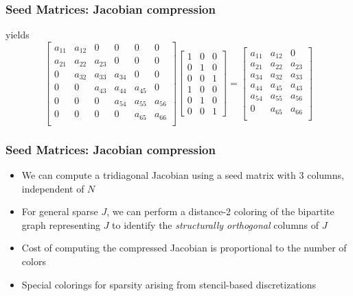 \documentclass[compact,12pt]{beamer}
\begin{document}
\begin{frame}
\large\frametitle{Seed Matrices: Jacobian compression}
yields
{\small
$$
\left[ \begin{array}{cccccc}
     a_{11} & a_{12} & 0 & 0 & 0 & 0\\
     a_{21} & a_{22} & a_{23} & 0 & 0 & 0\\
     0 & a_{32} & a_{33} & a_{34} & 0 & 0\\
     0 & 0 & a_{43} & a_{44} & a_{45} & 0\\
     0 & 0 & 0 & a_{54} & a_{55} & a_{56}\\
     0 & 0 & 0 & 0 & a_{65} & a_{66}\\
\end{array}\right]
\left[ \begin{array}{ccc}
1 & 0 & 0 \\
0 & 1 & 0 \\
0 & 0 & 1 \\
1 & 0 & 0 \\
0 & 1 & 0 \\
0 & 0 & 1 
\end{array}\right] = 
\left[ \begin{array}{ccc}
     a_{11} & a_{12} & 0 \\
     a_{21} & a_{22} & a_{23}\\
     a_{34} & a_{32} & a_{33}\\
     a_{44} & a_{45} & a_{43}\\
     a_{54} & a_{55} & a_{56}\\
     0      & a_{65} & a_{66}\\
\end{array}\right]
$$
}
\end{frame}

\begin{frame}
\large\frametitle{Seed Matrices: Jacobian compression}
\begin{itemize}
    \item We can compute a tridiagonal Jacobian using a seed matrix with 3 columns, independent of $N$
    \item For general sparse $J$, we can perform a distance-2 coloring of the bipartite graph representing  $J$ to identify the \emph{structurally orthogonal} columns of $J$
    \item Cost of computing the compressed Jacobian is proportional to the number of colors
    \item Special colorings for sparsity arising from stencil-based discretizations
\end{itemize}
\end{frame}
\end{document}
